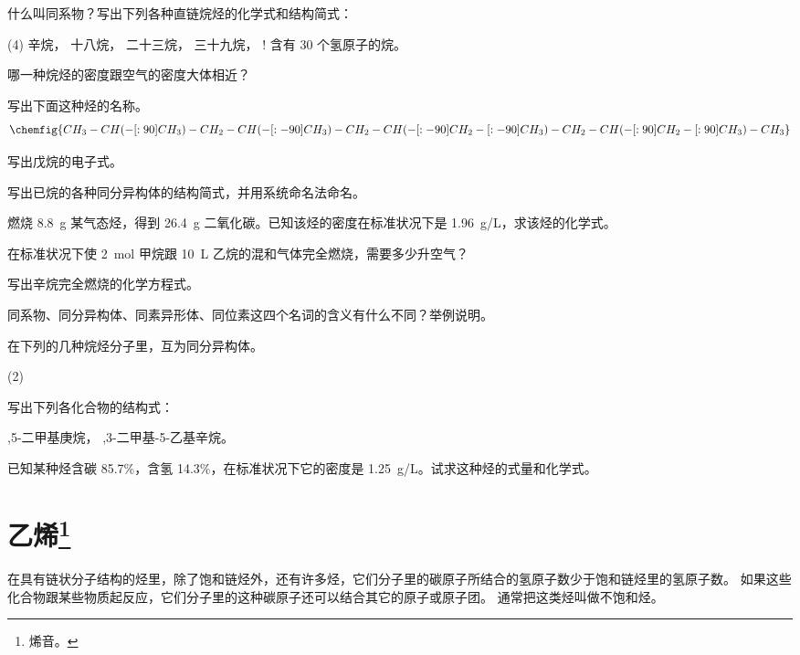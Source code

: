 \begin{Practice}[习题]
\begin{question}
  \item 什么叫同系物？写出下列各种直链烷烃的化学式和结构简式：
  \begin{tasks}(4)
    \task 辛烷，
    \task 十八烷，
    \task 二十三烷，
    \task 三十九烷，
    \task! 含有 30 个氢原子的烷。
  \end{tasks}
  \item 哪一种烷烃的密度跟空气的密度大体相近？
  \item 写出下面这种烃的名称。
  \[\chemfig{CH_3-CH(-[:90]CH_3)-CH_2-CH(-[:-90]CH_3)-CH_2-CH(-[:-90]CH_2-[:-90]CH_3)-CH_2-CH(-[:90]CH_2-[:90]CH_3)-CH_3}\]
  \item 写出戊烷的电子式。
  \item 写出已烷的各种同分异构体的结构简式，并用系统命名法命名。
  \item 燃烧 \qty{8.8}{g} 某气态烃，得到 \qty{26.4}{g} 二氧化碳。已知该烃的密度在标准状况下是 \qty{1.96}{g/L}，求该烃的化学式。
  \item 在标准状况下使 \qty{2}{mol} 甲烷跟 \qty{10}{L} 乙烷的混和气体完全燃烧，需要多少升空气？
  \item 写出辛烷完全燃烧的化学方程式。
  \item 同系物、同分异构体、同素异形体、同位素这四个名词的含义有什么不同？举例说明。
  \item 在下列的几种烷烃分子里，互为同分异构体。
  \begin{tasks}[label=\Alph*.](2)
    \task {}
    \task {}
    \task {}
    \task {}
    \task {}
  \end{tasks}
  \item 写出下列各化合物的结构式：
  \begin{tasks}
    ,5-二甲基庚烷，
    ,3-二甲基-5-乙基辛烷。
  \end{tasks}
  \item 已知某种烃含碳 85.7\%，含氢 14.3\%，在标准状况下它的密度是 \qty{1.25}{g/L}。试求这种烃的式量和化学式。
\end{question}
\end{Practice}


\section[乙烯]{乙烯\texorpdfstring{\protect\footnote{烯音。}}{}}
在具有链状分子结构的烃里，除了饱和链烃外，还有许多烃，它们分子里的碳原子所结合的氢原子数少于饱和链烃里的氢原子数。
如果这些化合物跟某些物质起反应，它们分子里的这种碳原子还可以结合其它的原子或原子团。
通常把这类烃叫做不饱和烃。


